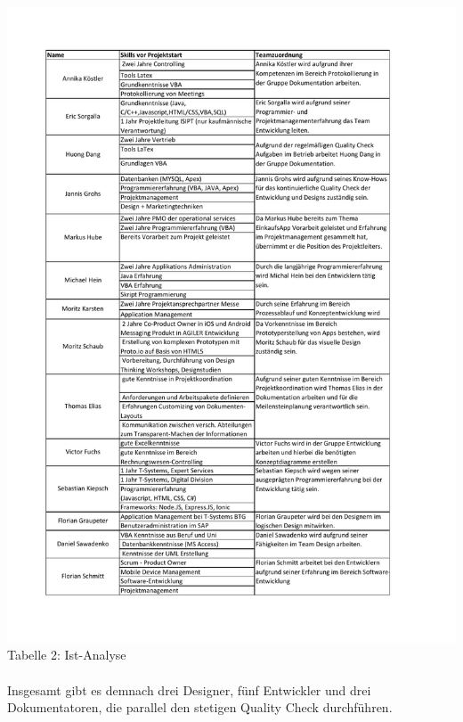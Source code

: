 \documentclass[12pt,a4paper]{article}
\begin{document}
\hspace*{-10mm} \includegraphics[trim = 15mm 0mm 0mm 20mm,clip,scale=0.8]{Skillliste.pdf}
\\
\footnotesize Tabelle 2: Ist-Analyse
\\
\normalsize
\linebreak
\\
\newline
\newline
Insgesamt gibt es demnach drei Designer, fünf Entwickler und drei Dokumentatoren, die parallel den stetigen Quality Check durchführen.
\\
\end{document}
